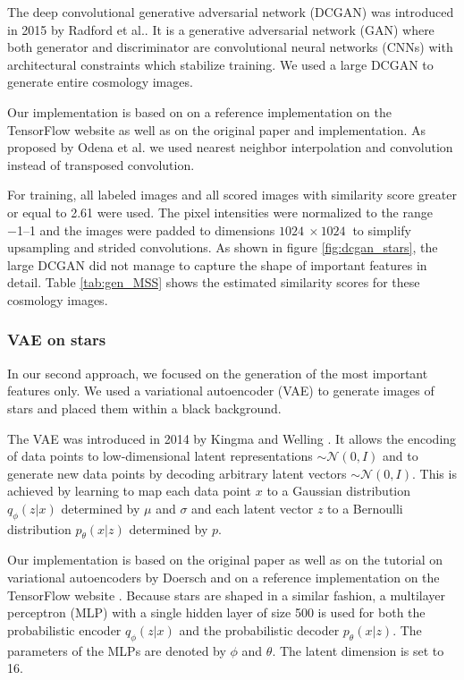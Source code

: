 \documentclass[10pt,conference,compsocconf]{IEEEtran}
\begin{document}
The deep convolutional generative adversarial network (DCGAN) was introduced in 2015 by Radford et al.\@ \cite{Radford}. It is a generative adversarial network (GAN) where both generator and discriminator are convolutional neural networks (CNNs) with architectural constraints which stabilize training. We used a large DCGAN to generate entire cosmology images. 

Our implementation is based on on a reference implementation on the TensorFlow website \cite{dcgantf} as well as on the original paper and implementation. As proposed by Odena et al.\@ \cite{Odena} we used nearest neighbor interpolation and convolution instead of transposed convolution.

For training, all labeled images and all scored images with similarity score greater or equal to \SI{2.61}{} were used. The pixel intensities were normalized to the range \SIrange{-1}{1}{} and the images were padded to dimensions $\SI{1024}{}\times\SI{1024}{}$ to simplify upsampling and strided convolutions. As shown in figure \ref{fig:dcgan_stars}, the large DCGAN did not manage to capture the shape of important features in detail. Table \ref{tab:gen_MSS} shows the estimated similarity scores for these cosmology images.

\subsubsection{VAE on stars} %
In our second approach, we focused on the generation of the most important features only. We used a variational autoencoder (VAE) to generate images of stars and placed them within a black background. 

The VAE was introduced in 2014 by Kingma and Welling \cite{DBLP:journals/corr/KingmaW13}. It allows the encoding of data points to low-dimensional latent representations  $\sim\mathcal{N}(0, I)$ and to generate new data points by decoding arbitrary latent vectors $\sim\mathcal{N}(0, I)$. This is achieved by learning to map each data point $x$ to a Gaussian distribution $q_{\phi}(z|x)$ determined by $\mu$ and $\sigma$ and each latent vector $z$ to a Bernoulli distribution $p_{\theta}(x|z)$ determined by $p$.
 
Our implementation is based on the original paper as well as on the tutorial on variational autoencoders by Doersch \cite{doersch2016tutorial} and on a reference implementation on the TensorFlow website \cite{cvaetf}. Because stars are shaped in a similar fashion, a multilayer perceptron (MLP) with a single hidden layer of size \SI{500}{} is used for both the probabilistic encoder $q_{\phi}(z|x)$ and the probabilistic decoder $p_{\theta}(x|z)$. The parameters of the MLPs are denoted by $\phi$ and $\theta$. The latent dimension is set to \SI{16}{}. 
\end{document}
